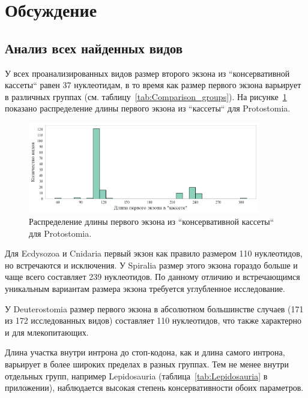 \clearpage
\section{Обсуждение}

\subsection{Анализ всех найденных видов}

У всех проанализированных видов размер второго экзона из ``консервативной кассеты`` равен 37 нуклеотидам, в то время как размер первого экзона варьирует в различных группах (см. таблицу~\ref{tab:Comparison_groups}).
На рисунке~\ref{fig:Protostomia_exon} показано распределение длины первого экзона из ``кассеты`` для Protostomia.

\begin{figure}[h] %
    \centering
    \includegraphics[width=0.9\textwidth]{images/Protostomia_exon}
    \caption{Распределение длины первого экзона из ``консервативной кассеты`` для Protostomia.}
    \label{fig:Protostomia_exon}
\end{figure}

Для Ecdysozoa и Cnidaria первый экзон как правило размером 110 нуклеотидов, но встречаются и исключения.
У Spiralia размер этого экзона гораздо больше и чаще всего составляет 239 нуклеотидов.
По данному отличию и встречающимся уникальным вариантам размера экзона требуется углубленное исследование.

У Deuterostomia размер первого экзона в абсолютном большинстве случаев (171 из 172 исследованных видов) составляет 110 нуклеотидов, что также характерно и для млекопитающих.

Длина участка внутри интрона до стоп-кодона, как и длина самого интрона, варьирует в более широких пределах в разных группах.
Тем не менее внутри отдельных групп, например Lepidosauria (таблица~\ref{tab:Lepidosauria} в приложении), наблюдается высокая степень консервативности обоих параметров.


